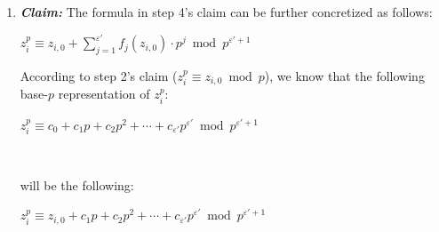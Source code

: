 \begin{enumerate}
\begin{myproof}
Based on step 3's claim ($z_i^p \equiv z_{i, 0}^p \bmod p^{\varepsilon'+1}$), we know that the value of $z_i^p \bmod p^{\varepsilon' + 1}$ depends only on $z_{i,0}$ (given $p$ and $\varepsilon'$ are fixed). Therefore, we can imagine that there exists some function $f(z_{i,0})$ whose input is $z_{i,0} \in [0, p-1]$ and the output is $z_i^p \in [0, p^{\varepsilon'+1} - 1]$. Alternatively, we can imagine that there exist $\varepsilon'+1$ different functions $f_0, f_1, \cdots, f_{\varepsilon'}$ such that each $f_j$ is a polynomial whose input is $z_{i,0} \in [0, p-1]$ and the output is $c_i \in [0, p-1]$, and $z_i^p \equiv \sum\limits_{j=0}^{\varepsilon'}f_j(z_{i,0})\cdot p^j \bmod p^{\varepsilon'+1}$. In this case, the input and output domain of each polynomial $f_j$ is $[0, p - 1]$. Therefore, we can design each $f_j$ as a $(p-1)$-degree polynomial and derive each $f_j$ based on polynomial interpolation (\autoref{sec:polynomial-interpolation}) by using $p$ coordinate values. 

Note that whenever we increase $\varepsilon'$ to $\varepsilon' + 1$, we add a new polynomial $f_{\varepsilon' + 1}$. However, the previous polynomials $f_0, f_1, \cdots, f_{\varepsilon'}$ stay the same as before, because increasing $\varepsilon'$ by 1 only adds a new base-$p$ constant $c_{\varepsilon' + 1}$ for the highest base-$p$ digit, while keeping the lower-digit constants $c_0, c_1, \cdots, c_{\varepsilon'}$ the same as before. Therefore, the polynomials $f_0, f_1, \cdots, f_{\varepsilon'}$, each of which computes  $c_0, c_1, \cdots, c_{\varepsilon'}$, also stay the same as before. 

\end{myproof}

\item \textbf{\textit{Claim:}} The formula in step 4's claim can be further concretized as follows:

$z_i^p \equiv z_{i,0} + \sum\limits_{j=1}^{\varepsilon'}f_j(z_{i,0})\cdot p^j \bmod p^{\varepsilon'+1}$

\begin{myproof}
According to step 2's claim ($z_i^{p} \equiv z_{i,0} \bmod p$), we know that the following base-$p$ representation of $z_i^p$:

$z_i^p \equiv c_0 + c_1p + c_2p^2 + \cdots + c_{\varepsilon'}p^{\varepsilon'} \bmod p^{\varepsilon'+1} $

$ $

will be the following:

$z_i^p \equiv z_{i,0} + c_1p + c_2p^2 + \cdots + c_{\varepsilon'}p^{\varepsilon'} \bmod p^{\varepsilon'+1} $


\end{myproof}
\end{enumerate}
